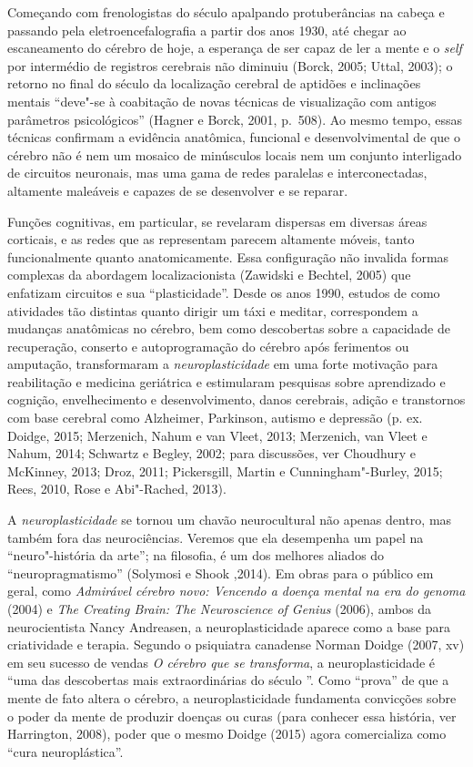 Começando com frenologistas do século  apalpando protuberâncias na
cabeça e passando pela eletroencefalografia a partir dos anos 1930, até
chegar ao escaneamento do cérebro de hoje, a esperança de ser capaz de
ler a mente e o \emph{self} por intermédio de registros cerebrais não diminuiu
(Borck, 2005; Uttal, 2003); o retorno no final do século  da
localização cerebral de aptidões e inclinações mentais ``deve"-se à
coabitação de novas técnicas de visualização com antigos parâmetros
psicológicos'' (Hagner e Borck, 2001, p.~508). Ao mesmo tempo, essas
técnicas confirmam a evidência anatômica, funcional e desenvolvimental
de que o cérebro não é nem um mosaico de minúsculos locais nem um
conjunto interligado de circuitos neuronais, mas uma gama de redes
paralelas e interconectadas, altamente maleáveis e capazes de se
desenvolver e se reparar.

Funções cognitivas, em particular, se revelaram dispersas em diversas
áreas corticais, e as redes que as representam parecem altamente móveis,
tanto funcionalmente quanto anatomicamente. Essa configuração não
invalida formas complexas da abordagem localizacionista (Zawidski e
Bechtel, 2005) que enfatizam circuitos e sua ``plasticidade''. Desde os
anos 1990, estudos de como atividades tão distintas quanto dirigir um táxi e
meditar, correspondem a mudanças anatômicas no cérebro, bem como
descobertas sobre a capacidade de recuperação, conserto e
autoprogramação do cérebro após ferimentos ou amputação, transformaram a
\emph{neuroplasticidade} em uma forte motivação para reabilitação e
medicina geriátrica e estimularam pesquisas sobre aprendizado e
cognição, envelhecimento e desenvolvimento, danos cerebrais, adição e
transtornos com base cerebral como Alzheimer, Parkinson, autismo e
depressão (p. ex. Doidge, 2015; Merzenich, Nahum e van Vleet, 2013;
Merzenich, van Vleet e Nahum, 2014; Schwartz e Begley, 2002; para
discussões, ver Choudhury e McKinney, 2013; Droz, 2011; Pickersgill,
Martin e Cunningham"-Burley, 2015; Rees, 2010, Rose e Abi"-Rached, 2013).

A \emph{neuroplasticidade} se tornou um chavão neurocultural não apenas
dentro, mas também fora das neurociências. Veremos que ela desempenha um
papel na ``neuro"-história da arte''; na filosofia, é um dos melhores
aliados do ``neuropragmatismo'' (Solymosi e Shook ,2014). Em obras para
o público em geral, como \emph{Admirável cérebro novo: Vencendo a doença
mental na era do genoma} (2004) e \emph{The Creating Brain: The
Neuroscience of Genius} (2006), ambos da neurocientista Nancy Andreasen,
a neuroplasticidade aparece como a base para criatividade e terapia.
Segundo o psiquiatra canadense Norman Doidge (2007, xv) em seu sucesso
de vendas \emph{O cérebro que se transforma}, a neuroplasticidade é
``uma das descobertas mais extraordinárias do século ''. Como
``prova'' de que a mente de fato altera o cérebro, a neuroplasticidade
fundamenta convicções sobre o poder da mente de produzir doenças ou
curas (para conhecer essa história, ver Harrington, 2008), poder que o mesmo
Doidge (2015) agora comercializa como ``cura neuroplástica''.

